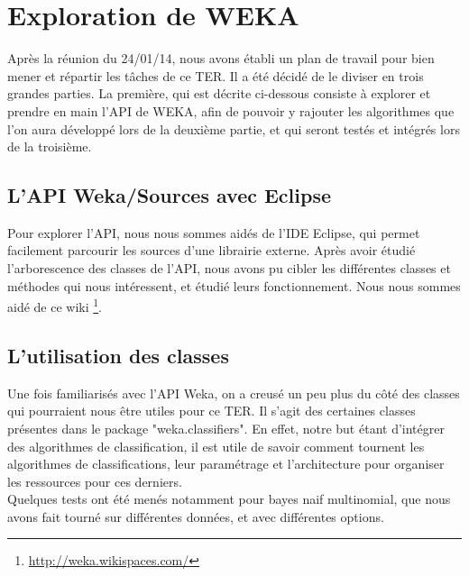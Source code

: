 \documentclass{article}
\begin{document}
\section{Exploration de WEKA}
Après la réunion du 24/01/14, nous avons établi un plan de travail pour bien mener et répartir les tâches de ce TER. Il a été décidé de le diviser en trois grandes parties. La première, qui est décrite ci-dessous consiste à explorer et prendre en main l'API de WEKA, afin de pouvoir y rajouter les algorithmes que l'on aura développé lors de la deuxième partie, et qui seront testés et intégrés lors de la troisième.
\subsection{L'API Weka/Sources avec Eclipse}
Pour explorer l'API, nous nous sommes aidés de l'IDE Eclipse, qui permet facilement parcourir les sources d'une librairie externe. Après avoir étudié l'arborescence des classes de l'API, nous avons pu cibler les différentes classes et méthodes qui nous intéressent, et étudié leurs fonctionnement. Nous nous sommes aidé de ce wiki \footnote{\href{http://weka.wikispaces.com/}{http://weka.wikispaces.com/}}.

\subsection{L'utilisation des classes}
Une fois familiarisés avec l'API Weka, on a creusé un peu plus du côté des classes qui pourraient nous être utiles pour ce TER. Il s'agit des certaines classes présentes dans le package{\scriptsize { \normalsize "weka.classifiers"}}. En effet, notre but étant d'intégrer des algorithmes de classification, il est utile de savoir comment tournent les algorithmes de classifications, leur paramétrage et l'architecture pour organiser les ressources pour ces derniers.\\
Quelques tests ont été menés notamment pour bayes naif multinomial, que nous avons fait tourné sur différentes données, et avec différentes options.
\end{document}

